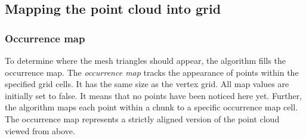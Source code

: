 \subsection{Mapping the point cloud into grid}

\subsubsection{Occurrence map}

To determine where the mesh triangles should appear, the algorithm fills the occurrence map. The \textit{occurrence map} tracks the appearance of points within the specified grid cells. It has the same size as the vertex grid. All map values are initially set to false. It means that no points have been noticed here yet. Further, the algorithm maps each point within a chunk to a specific occurrence map cell. The occurrence map represents a strictly aligned version of the point cloud viewed from above.

